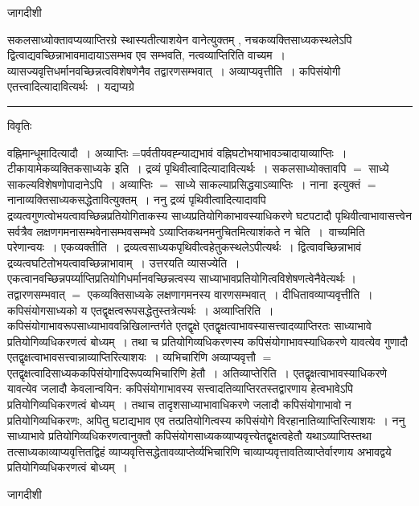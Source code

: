 \documentclass[10pt, openany]{book}
\begin{document}
{\begin{center} जागदीशी \end{center}
{\la सकलसाध्योक्तावप्यव्याप्तिरग्रे स्थास्यतीत्याशयेन वानेत्युक्तम् , नचकव्यक्तिसाध्यकस्थलेऽपि द्वित्वाद्यवच्छिन्नाभावमादायाऽसम्भव एव सम्भवति, नत्वव्याप्तिरिति वाच्यम~। व्यासज्यवृत्तिधर्मानवच्छिन्नत्वविशेषणेनैव तद्वारणसम्भवात्~। अव्याप्यवृत्तीति~। कपिसंयोगी एतत्त्वादित्यादावित्यर्थः~। यद्यप्यग्रे}\\
\hrule
\begin{center}     विवृतिः \end{center}
वह्निमान्धूमादित्यादौ~। अव्याप्तिः =पर्वतीयवह्न्याद्यभावं वह्निघटोभयाभावञ्चादायाव्याप्तिः~। {\qt टीकायामेकव्यक्तिकसाध्यके} इति~। द्रव्यं पृथिवीत्वादित्यादावित्यर्थः~। सकलसाध्योक्तावपि $=$ साध्ये साकल्यविशेषणोपादानेऽपि~। अव्याप्तिः $=$ साध्ये साकल्याप्रसिद्धयाऽव्याप्तिः~। नाना\textemdash\ इत्युक्तं $=$ नानाव्यक्तिसाध्यकसद्धेतावित्युक्तम्~। ननु द्रव्यं पृथिवीत्वादित्यादावपि द्रव्यत्वगुणत्वोभयत्वावच्छिन्नप्रतियोगिताकस्य साध्यप्रतियोगिकाभावस्याधिकरणे घटपटादौ पृथिवीत्वाभावासत्त्वेन सर्वत्रैव लक्षणगमनासम्भवेनासम्भवसम्भवे ऽव्याप्तिकथनमनुचितमित्याशंकते {\la न चेति~।}~वाच्यमिति परेणान्वयः~। एकव्यक्तीति~। द्रव्यत्वसाध्यकपृथिवीत्वहेतुकस्थलेऽपीत्यर्थः~। द्वित्वावच्छिन्नाभावं  द्रव्यत्वघटितोभयत्वावच्छिन्नाभावाम्~। {\qt उत्तरयति } व्यासज्येति~। एकत्वानवच्छिन्नपर्य्याप्तिप्रतियोगिधर्मानवच्छिन्नत्वस्य साध्याभावप्रतियोगित्वविशेषणत्वेनैवेत्यर्थः । तद्वारणसम्भवात् $=$ एकव्यक्तिसाध्यके लक्षणागमनस्य वारणसम्भवात्~।  दीधितावव्याप्यवृत्तीति~। कपिसंयोगसाध्यको य एतद्वृक्षत्वरूपसद्धेतुस्तत्रेत्यर्थः~। अव्याप्तिरिति~। कपिसंयोगाभावरूपसाध्याभाववन्निखिलान्तर्गते एतद्वृक्षे एतद्वृक्षत्वाभावस्यासत्त्वादव्याप्तिरतः साध्याभावे प्रतियोगिव्यधिकरणत्वं बोध्यम्~। तथा च प्रतियोगिव्यधिकरणस्य कपिसंयोगाभावस्याधिकरणे यावत्येव गुणादौ एतद्वृक्षत्वाभावसत्त्वान्नाव्याप्तिरित्याशयः~। व्यभिचारिणि अव्याप्यवृत्तौ $=$ एतद्वृक्षत्वादिसाध्यककपिसंयोगादिरूपव्यभिचारिणि हेतौ~। अतिव्याप्तेरिति~। एतद्वृक्षत्वाभावस्याधिकरणे यावत्येव जलादौ केवलान्वयिन: कपिसंयोगाभावस्य सत्त्वादतिव्याप्तिरतस्तद्वारणाय हेत्वभावेऽपि प्रतियोगिव्यधिकरणत्वं बोध्यम्~। तथाच तादृशसाध्याभावाधिकरणे जलादौ कपिसंयोगाभावो न प्रतियोगिव्यधिकरणः, अपितु घटाद्यभाव एव तत्प्रतियोगित्वस्य कपिसंयोगे विरहानातिव्याप्तिरित्याशयः~। ननु साध्याभावे प्रतियोगिव्यधिकरणत्वानुक्तौ कपिसंयोगसाध्यकव्याप्यवृत्त्येतद्वृक्षत्वहेतौ यथाऽव्याप्तिस्तथा तत्साध्यकाव्याप्यवृत्तितद्विहं
\newpage
{\la व्याप्यवृत्तिसद्धेतावव्याप्तेर्व्यभिचारिणि
चाव्याप्यवृत्तावतिव्याप्तेर्वारणाय {\qt अभावद्वये} प्रतियोगिव्यधिकरणत्वं बोध्यम्~।}
\begin{center} जागदीशी \end{center}
}
\end{document}
